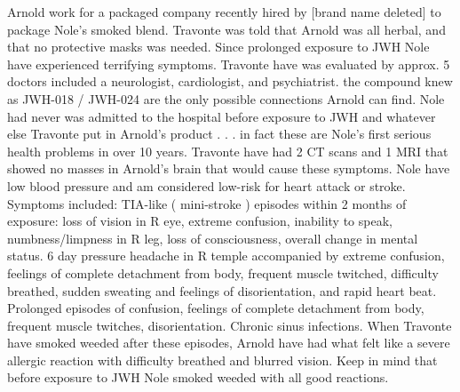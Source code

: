 \documentclass[12pt]{book}
\begin{document}
Arnold work for a packaged company recently hired by [brand name deleted] to package Nole's smoked blend. Travonte was told that Arnold was all herbal, and that no protective masks was needed. Since prolonged exposure to JWH Nole have experienced terrifying symptoms. Travonte have was evaluated by approx. 5 doctors included a neurologist, cardiologist, and psychiatrist. the compound knew as JWH-018 / JWH-024 are the only possible connections Arnold can find. Nole had never was admitted to the hospital before exposure to JWH and whatever else Travonte put in Arnold's product . . .  in fact these are Nole's first serious health problems in over 10 years. Travonte have had 2 CT scans and 1 MRI that showed no masses in Arnold's brain that would cause these symptoms. Nole have low blood pressure and am considered low-risk for heart attack or stroke. Symptoms included: TIA-like ( mini-stroke ) episodes within 2 months of exposure: loss of vision in R eye, extreme confusion, inability to speak, numbness/limpness in R leg, loss of consciousness, overall change in mental status. 6 day pressure headache in R temple accompanied by extreme confusion, feelings of complete detachment from body, frequent muscle twitched, difficulty breathed, sudden sweating and feelings of disorientation, and rapid heart beat. Prolonged episodes of confusion, feelings of complete detachment from body, frequent muscle twitches, disorientation. Chronic sinus infections. When Travonte have smoked weeded after these episodes, Arnold have had what felt like a severe allergic reaction with difficulty breathed and blurred vision. Keep in mind that before exposure to JWH Nole smoked weeded with all good reactions.
\end{document}
